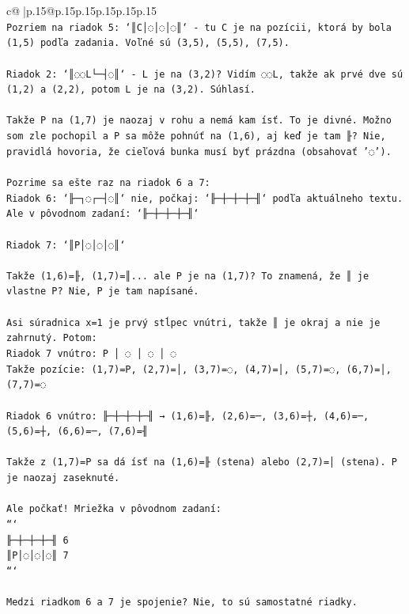 \documentclass{article}
\begin{document}
{\begin{supertabular}{c@{$\;$}|p{.15\linewidth}@{}p{.15\linewidth}p{.15\linewidth}p{.15\linewidth}p{.15\linewidth}p{.15\linewidth}}
{{{\\ 
\texttt{Pozriem na riadok 5: `║C│◌│◌│◌║` {-} tu C je na pozícii, ktorá by bola (1,5) podľa zadania. Voľné sú (3,5), (5,5), (7,5).} \\
\\ 
\texttt{Riadok 2: `║◌◌L└─┤◌║` {-} L je na (3,2)? Vidím ◌◌L, takže ak prvé dve sú (1,2) a (2,2), potom L je na (3,2). Súhlasí.} \\
\\ 
\texttt{Takže P na (1,7) je naozaj v rohu a nemá kam ísť. To je divné. Možno som zle pochopil a P sa môže pohnúť na (1,6), aj keď je tam ╟? Nie, pravidlá hovoria, že cieľová bunka musí byť prázdna (obsahovať '◌').} \\
\\ 
\texttt{Pozrime sa ešte raz na riadok 6 a 7:} \\
\texttt{Riadok 6: `╟─┐◌┌─┤◌║` nie, počkaj: `╟─┼─┼─┼─╢` podľa aktuálneho textu. Ale v pôvodnom zadaní: `╟─┼─┼─┼─╢`} \\
\\ 
\texttt{Riadok 7: `║P│◌│◌│◌║`} \\
\\ 
\texttt{Takže (1,6)=╟, (1,7)=║... ale P je na (1,7)? To znamená, že ║ je vlastne P? Nie, P je tam napísané.} \\
\\ 
\texttt{Asi súradnica x=1 je prvý stĺpec vnútri, takže ║ je okraj a nie je zahrnutý. Potom:} \\
\texttt{Riadok 7 vnútro: P │ ◌ │ ◌ │ ◌} \\
\texttt{Takže pozície: (1,7)=P, (2,7)=│, (3,7)=◌, (4,7)=│, (5,7)=◌, (6,7)=│, (7,7)=◌} \\
\\ 
\texttt{Riadok 6 vnútro: ╟─┼─┼─┼─╢ → (1,6)=╟, (2,6)=─, (3,6)=┼, (4,6)=─, (5,6)=┼, (6,6)=─, (7,6)=╢} \\
\\ 
\texttt{Takže z (1,7)=P sa dá ísť na (1,6)=╟ (stena) alebo (2,7)=│ (stena). P je naozaj zaseknuté.} \\
\\ 
\texttt{Ale počkať! Mriežka v pôvodnom zadaní:} \\
\texttt{```} \\
\texttt{╟─┼─┼─┼─╢ 6} \\
\texttt{║P│◌│◌│◌║ 7} \\
\texttt{```} \\
\\ 
\texttt{Medzi riadkom 6 a 7 je spojenie? Nie, to sú samostatné riadky. } \\
}}}
\end{supertabular}}
\end{document}
